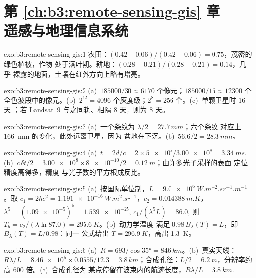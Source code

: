 \section*{第 \ref{ch:b3:remote-sensing-gis} 章——遥感与地理信息系统}

\begin{solution}{exo:b3:remote-sensing-gis:1}
农田：$(0.42 - 0.06)/(0.42 + 0.06) = 0.75$，茂密的绿色植被，作物
处于满叶期。耕地：$(0.28 - 0.21)/(0.28 + 0.21) = 0.14$，几乎
裸露的地面，土壤在红外方向上略有增亮。
\end{solution}

\begin{solution}{exo:b3:remote-sensing-gis:2}
(a)~$185000/30 \approx 6170$ 个像元；$185000/15 \approx 12300$ 个
全色波段中的像元。(b)~$2^{12} = 4096$ 个灰度级；$2^8 = 256$ 个。(c)~单颗卫星时 16 天
；若 Landsat~9 与之同轨、相隔 8 天，则为 8 天。
\end{solution}

\begin{solution}{exo:b3:remote-sensing-gis:3}
(a)~一个条纹为 $\lambda/2 = \qty{27.7}{mm}$；六个条纹
对应上 \qty{166}{mm} 的变化，此处远离卫星，因为
盆地在下沉。(b)~$56.6/2 = \qty{28.3}{mm}$。
\end{solution}

\begin{solution}{exo:b3:remote-sensing-gis:4}
(a)~$t = 2d/c = 2\times\num{5e5}/\num{3.00e8} = \qty{3.34}{ms}$.
(b)~$c\,\delta t/2 = \num{3.00e8}\times\num{8e-10}/2 = \qty{0.12}{m}$；由许多光子采样的表面
定位精度高得多，精度
与光子数的平方根成反比。
\end{solution}

\begin{solution}{exo:b3:remote-sensing-gis:5}
(a)~按国际单位制，$L = \qty{9.0e6}{W.m^{-2}.sr^{-1}.m^{-1}}$。取 $c_1 =
2hc^2 = \qty{1.191e-16}{W.m^2.sr^{-1}}$，$c_2 = \qty{0.014388}{m.K}$，
$\lambda^5 = (\num{1.09e-5})^5 = \num{1.539e-25}$, $c_1/(\lambda^5L) = 86.0$,
则 $T_b = c_2/(\lambda\ln 87.0) = \qty{295.6}{K}$。(b)~动力学温度
满足 $0.98\,B_\lambda(T) = L$，即 $B_\lambda(T) = L/0.98$：同一
公式给出 $T = \qty{296.9}{K}$，高出 \qty{1.3}{K}。
\end{solution}

\begin{solution}{exo:b3:remote-sensing-gis:6}
(a)~$R = 693/\cos\ang{35} = \qty{846}{km}$。(b)~真实天线：$R\lambda/L =
\num{8.46e5}\times0.0555/12.3 = \qty{3.8}{km}$；合成孔径：$L/2 =
\qty{6.2}{m}$，分辨率约高 600 倍。(c)~合成孔径为
某点停留在波束内的航迹长度，$R\lambda/L =
\qty{3.8}{km}$.
\end{solution}

